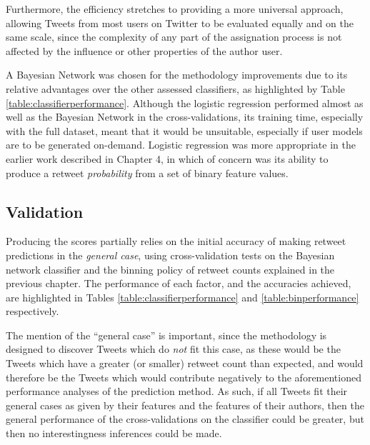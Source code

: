 Furthermore, the efficiency stretches to providing a more universal approach, allowing Tweets from most users on Twitter to be evaluated equally and on the same scale, since the complexity of any part of the assignation process is not affected by the influence or other properties of the author user. 

A Bayesian Network was chosen for the methodology improvements due to its relative advantages over the other assessed classifiers, as highlighted by Table \ref{table:classifierperformance}. Although the logistic regression performed almost as well as the Bayesian Network in the cross-validations, its training time, especially with the full dataset, meant that it would be unsuitable, especially if user models are to be generated on-demand. Logistic regression was more appropriate in the earlier work described in Chapter 4, in which of concern was its ability to produce a retweet \textit{probability} from a set of binary feature values. 


\subsection{Validation}
Producing the scores partially relies on the initial accuracy of making retweet predictions in the \textit{general case}, using cross-validation tests on the Bayesian network classifier and the binning policy of retweet counts explained in the previous chapter. The performance of each factor, and the accuracies achieved, are highlighted in Tables \ref{table:classifierperformance} and \ref{table:binperformance} respectively.

The mention of the ``general case'' is important, since the methodology is designed to discover Tweets which do \textit{not} fit this case, as these would be the Tweets which have a greater (or smaller) retweet count than expected, and would therefore be the Tweets which would contribute negatively to the aforementioned performance analyses of the prediction method. As such, if all Tweets fit their general cases as given by their features and the features of their authors, then the general performance of the cross-validations on the classifier could be greater, but then no interestingness inferences could be made.

